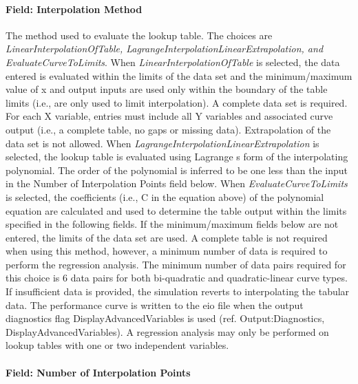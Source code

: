 \paragraph{Field: Interpolation Method}\label{field-interpolation-method-2}

The method used to evaluate the lookup table. The choices are \emph{LinearInterpolationOfTable, LagrangeInterpolationLinearExtrapolation, and EvaluateCurveToLimits}. When \emph{LinearInterpolationOfTable} is selected, the data entered is evaluated within the limits of the data set and the minimum/maximum value of x and output inputs are used only within the boundary of the table limits (i.e., are only used to limit interpolation). A complete data set is required. For each X variable, entries must include all Y variables and associated curve output (i.e., a complete table, no gaps or missing data). Extrapolation of the data set is not allowed. When \emph{LagrangeInterpolationLinearExtrapolation} is selected, the lookup table is evaluated using Lagrange s form of the interpolating polynomial. The order of the polynomial is inferred to be one less than the input in the Number of Interpolation Points field below. When \emph{EvaluateCurveToLimits} is selected, the coefficients (i.e., C in the equation above) of the polynomial equation are calculated and used to determine the table output within the limits specified in the following fields. If the minimum/maximum fields below are not entered, the limits of the data set are used. A complete table is not required when using this method, however, a minimum number of data is required to perform the regression analysis. The minimum number of data pairs required for this choice is 6 data pairs for both bi-quadratic and quadratic-linear curve types. If insufficient data is provided, the simulation reverts to interpolating the tabular data. The performance curve is written to the eio file when the output diagnostics flag DisplayAdvancedVariables is used (ref. Output:Diagnostics, DisplayAdvancedVariables). A regression analysis may only be performed on lookup tables with one or two independent variables.

\paragraph{Field: Number of Interpolation Points}\label{field-number-of-interpolation-points}

